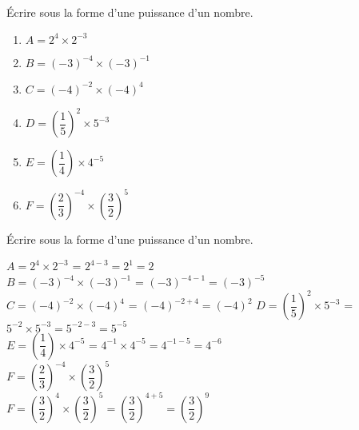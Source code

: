 \begin{exercice*}    
    Écrire sous la forme d'une puissance d'un nombre.
    \begin{multicols}{2}
        \begin{spacing}{2}
            \begin{enumerate}
                \item[] $A=2^4\times 2^{-3}$
                \item[] $B=(-3)^{-4}\times (-3)^{-1}$
                \item[] $C=(-4)^{-2}\times (-4)^4$
            \columnbreak
                \item[] $D=\left(\dfrac{1}{5}\right)^2\times 5^{-3}$
                \item[] $E=\left(\dfrac{1}{4}\right)\times 4^{-5}$
                \item[] $F=\left(\dfrac{2}{3}\right)^{-4}\times \left(\dfrac{3}{2}\right)^5$
            \end{enumerate}
        \end{spacing}
    \end{multicols}
\end{exercice*}
\begin{corrige}
    Écrire sous la forme d'une puissance d'un nombre.
        \begin{spacing}{2}
            $A=2^4\times 2^{-3}$                                                   {\red = $2^{4-3}=2^1=2$} \\
            $B=(-3)^{-4}\times (-3)^{-1}$                                          {\red = $(-3)^{-4-1}=(-3)^{-5}$} \\
            $C=(-4)^{-2}\times (-4)^4$                                             {\red = $(-4)^{-2+4}=(-4)^2$}                                                                        
            $D=\left(\dfrac{1}{5}\right)^2\times 5^{-3}$                           {\red = $5^{-2}\times 5^{-3}=5^{-2-3}=5^{-5}$}  \\
            $E=\left(\dfrac{1}{4}\right)\times 4^{-5}$                             {\red = $4^{-1}\times 4^{-5}=4^{-1-5}=4^{-6}$}  \\
            $F=\left(\dfrac{2}{3}\right)^{-4}\times \left(\dfrac{3}{2}\right)^5$   \\
            {\red $F=\left(\dfrac{3}{2}\right)^4\times \left(\dfrac{3}{2}\right)^5=\left(\dfrac{3}{2}\right)^{4+5}=\left(\dfrac{3}{2}\right)^9$}  
        \end{spacing}
\end{corrige}


